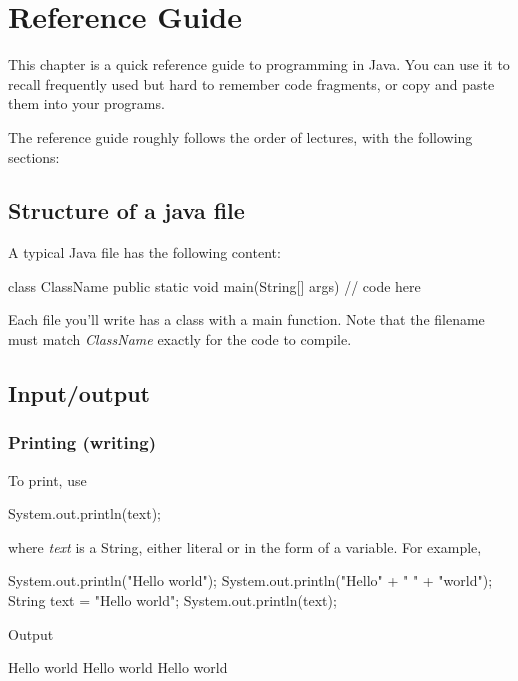 \chapter{Reference Guide}\label{ch:quick_guide}

This chapter is a quick reference guide to programming in Java. You can use it to recall frequently used but hard to remember code fragments, or copy and paste them into your programs. 

The reference guide roughly follows the order of lectures, with the following sections: 

\minitoc

\section{Structure of a java file}

A typical Java file has the following content:

\begin{code}
class ClassName {
    public static void main(String[] args) {
        // code here
    }
}
\end{code}

Each file you'll write has a class with a main function. Note that the filename must match \textit{ClassName} exactly for the code to compile.

\section{Input/output}

\subsection{Printing (writing)}

To print, use 

\begin{code}
System.out.println(text);
\end{code}

where \textit{text} is a String, either literal or in the form of a variable. For example,

\begin{code}
System.out.println("Hello world");
System.out.println("Hello" + " " + "world");
String text = "Hello world";
System.out.println(text);
\end{code}

Output
\begin{code}
Hello world
Hello world
Hello world
\end{code}

